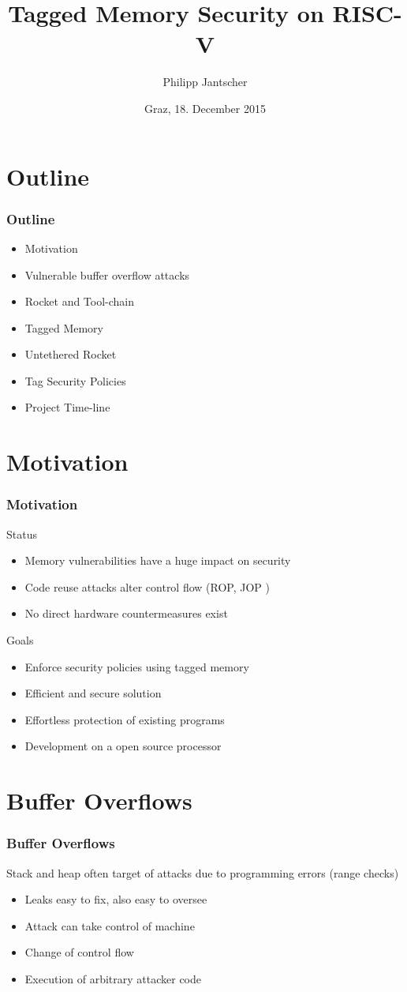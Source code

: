 \documentclass{beamer}
\title[Tagged Memory Security on RISC-V]{Tagged Memory Security on RISC-V}
\author{Philipp Jantscher}
\date{Graz, 18. December 2015}		%
\institute[IAIK]{IAIK}
\begin{document}
\titleframe

\section{Outline}
\begin{frame}
	\frametitle{Outline}
	\begin{itemize}
		\item Motivation
    	\item Vulnerable buffer overflow attacks
    	\item Rocket and Tool-chain
    	\item Tagged Memory
    	\item Untethered Rocket
    	\item Tag Security Policies
    	\item Project Time-line
	\end{itemize}
\end{frame}


\section{Motivation}
\begin{frame}
	\frametitle{Motivation}
	Status
	\begin{itemize}
		\item Memory vulnerabilities have a huge impact on security
		\item Code reuse attacks alter control flow (ROP, JOP )
    	\item No direct hardware countermeasures exist %
	\end{itemize}
	Goals
	\begin{itemize}
		\item Enforce security policies using tagged memory
    	\item Efficient and secure solution
    	\item Effortless protection of  existing programs
    	\item Development on a open source processor 
	\end{itemize}
\end{frame}

\section{Buffer Overflows}
\begin{frame}
	\frametitle{Buffer Overflows}
	Stack and heap often target of attacks due to programming errors (range checks)
	\begin{itemize}
		\item Leaks easy to fix,  also easy to oversee
		\item Attack can take control of machine
		\item Change of control flow
		\item Execution of arbitrary attacker code
	\end{itemize}
\end{frame}
\end{document}
